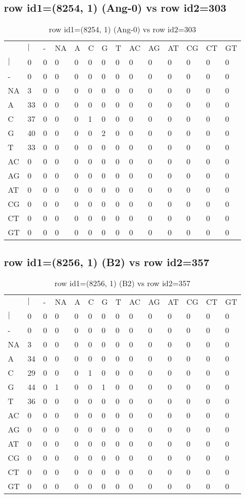 \subsection{row id1=(8254, 1) (Ang-0) vs row id2=303}
\begin{center}
\begin{longtable}{|l|l|l|l|l|l|l|l|l|l|l|l|l|l|}
\caption{row id1=(8254, 1) (Ang-0) vs row id2=303} \label{table_dm196}\\
\hline
\\
\hline
&$|$&-&NA&A&C&G&T&AC&AG&AT&CG&CT&GT\\
$|$&0&0&0&0&0&0&0&0&0&0&0&0&0\\
-&0&0&0&0&0&0&0&0&0&0&0&0&0\\
NA&3&0&0&0&0&0&0&0&0&0&0&0&0\\
A&33&0&0&0&0&0&0&0&0&0&0&0&0\\
C&37&0&0&0&1&0&0&0&0&0&0&0&0\\
G&40&0&0&0&0&2&0&0&0&0&0&0&0\\
T&33&0&0&0&0&0&0&0&0&0&0&0&0\\
AC&0&0&0&0&0&0&0&0&0&0&0&0&0\\
AG&0&0&0&0&0&0&0&0&0&0&0&0&0\\
AT&0&0&0&0&0&0&0&0&0&0&0&0&0\\
CG&0&0&0&0&0&0&0&0&0&0&0&0&0\\
CT&0&0&0&0&0&0&0&0&0&0&0&0&0\\
GT&0&0&0&0&0&0&0&0&0&0&0&0&0\\
\hline
\end{longtable}
\end{center}

\subsection{row id1=(8256, 1) (B2) vs row id2=357}
\begin{center}
\begin{longtable}{|l|l|l|l|l|l|l|l|l|l|l|l|l|l|}
\caption{row id1=(8256, 1) (B2) vs row id2=357} \label{table_dm198}\\
\hline
\\
\hline
&$|$&-&NA&A&C&G&T&AC&AG&AT&CG&CT&GT\\
$|$&0&0&0&0&0&0&0&0&0&0&0&0&0\\
-&0&0&0&0&0&0&0&0&0&0&0&0&0\\
NA&3&0&0&0&0&0&0&0&0&0&0&0&0\\
A&34&0&0&0&0&0&0&0&0&0&0&0&0\\
C&29&0&0&0&1&0&0&0&0&0&0&0&0\\
G&44&0&1&0&0&1&0&0&0&0&0&0&0\\
T&36&0&0&0&0&0&0&0&0&0&0&0&0\\
AC&0&0&0&0&0&0&0&0&0&0&0&0&0\\
AG&0&0&0&0&0&0&0&0&0&0&0&0&0\\
AT&0&0&0&0&0&0&0&0&0&0&0&0&0\\
CG&0&0&0&0&0&0&0&0&0&0&0&0&0\\
CT&0&0&0&0&0&0&0&0&0&0&0&0&0\\
GT&0&0&0&0&0&0&0&0&0&0&0&0&0\\
\hline
\end{longtable}
\end{center}

